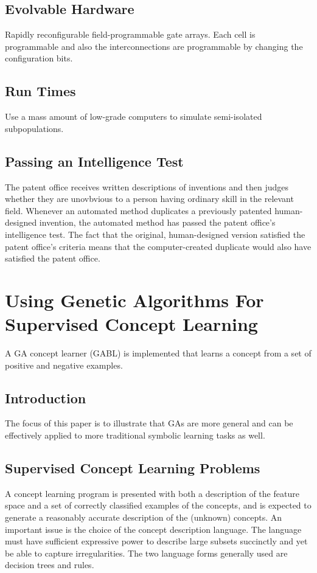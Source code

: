 \documentclass[12pt]{article}
\begin{document}
\subsection{Evolvable Hardware}
Rapidly reconfigurable field-programmable gate arrays. Each cell is programmable and also the interconnections are programmable by changing the configuration bits.

\subsection{Run Times}
Use a mass amount of low-grade computers to simulate semi-isolated subpopulations.

\subsection{Passing an Intelligence Test}
The patent office receives written descriptions of inventions and then judges whether they are unovbvious to a person having ordinary skill in the relevant field. Whenever an automated method duplicates a previously patented  human-designed invention, the automated method has passed the patent office's intelligence test. The fact that the original, human-designed version satisfied the patent office's criteria means that the computer-created duplicate would also have satisfied the patent office.
\clearpage

\section{Using Genetic Algorithms For Supervised Concept Learning}
A GA concept learner (GABL) is implemented that learns a concept from a set of positive and negative examples.

\subsection{Introduction}
The focus of this paper is to illustrate that GAs are more general and can be effectively applied to more traditional symbolic learning tasks as well.

\subsection{Supervised Concept Learning Problems}
A concept learning program is presented with both a description of the feature space and a set of correctly classified examples of the concepts, and is expected to generate a reasonably accurate description of the (unknown) concepts. An important issue is the choice of the concept description language. The language must have sufficient expressive power to describe large subsets succinctly and yet be able to capture irregularities. The two language forms generally used are decision trees and rules.
\end{document}
